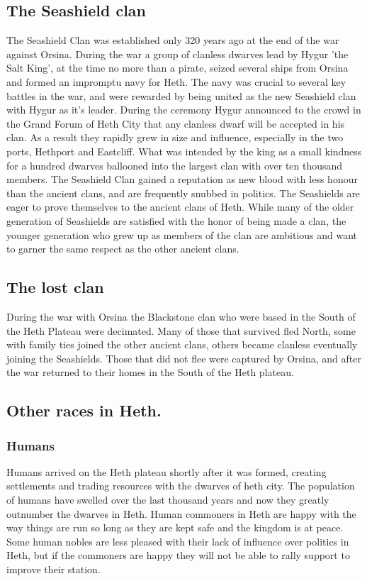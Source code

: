 \documentclass[10pt,twoside,twocolumn,openany,justified,bg=full,nomultitoc]{dndbook}
\begin{document}
\subsection{The Seashield clan}
\label{sec-2-2-2}
The Seashield Clan was established only 320 years ago at the end of the war against Orsina. During the war a group of clanless dwarves lead by Hygur 'the Salt King', at the time no more than a pirate, seized several ships from Orsina and formed an impromptu navy for Heth.
The navy was crucial to several key battles in the war, and were rewarded by being united as the new Seashield clan with Hygur as it's leader. During the ceremony Hygur announced to the crowd in the Grand Forum of Heth City that any clanless dwarf will be accepted in his clan. As a result they rapidly grew in size and influence, especially in the two ports, Hethport and Eastcliff. What was intended by the king as a small kindness for a hundred dwarves ballooned into the largest clan with over ten thousand members.
The Seashield Clan gained a reputation as new blood with less honour than the ancient clans, and are frequently snubbed in politics. 
The Seashields are eager to prove themselves to the ancient clans of Heth. While many of the older generation of Seashields are satisfied with the honor of being made a clan, the younger generation who grew up as members of the clan are ambitious and want to garner the same respect as the other ancient clans.

\subsection{The lost clan}
\label{sec-2-2-3}
During the war with Orsina the Blackstone clan who were based in the South of the Heth Plateau were decimated. Many of those that survived fled North, some with family ties joined the other ancient clans, others became clanless eventually joining the Seashields. Those that did not flee were captured by Orsina, and after the war returned to their homes in the South of the Heth plateau. 


\subsection{Other races in Heth.}
\label{sec-2-2-4}

\subsubsection{Humans}
\label{sec-2-2-4-1}
Humans arrived on the Heth plateau shortly after it was formed, creating settlements and trading resources with the dwarves of heth city. The population of humans have swelled over the last thousand years and now they greatly outnumber the dwarves in Heth. Human commoners in Heth are happy with the way things are run so long as they are kept safe and the kingdom is at peace. Some human nobles are less pleased with their lack of influence over politics in Heth, but if the commoners are happy they will not be able to rally support to improve their station.
\end{document}
